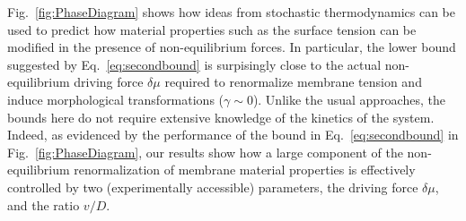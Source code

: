 \documentclass[amsmath,preprintnumbers,10pt,nofootinbib,prl,twocolumn]{revtex4-1}
\begin{document}
Fig.~\ref{fig:PhaseDiagram} shows how ideas from stochastic thermodynamics can be used to predict how material properties such as the surface tension can be modified in the presence of non-equilibrium forces. In particular, the lower bound suggested by Eq.~\ref{eq:secondbound} is surpisingly close to the actual non-equilibrium driving force $\delta \mu$ required to renormalize membrane tension and induce morphological transformations ($\gamma\sim 0$). Unlike the usual approaches, the bounds here do not require extensive knowledge of the kinetics of the system. Indeed, as evidenced by the performance of the bound in Eq.~\ref{eq:secondbound} in Fig.~\ref{fig:PhaseDiagram}, our results show how a large component of the non-equilibrium renormalization of membrane material properties is effectively controlled by two (experimentally accessible) parameters, the driving force $\delta \mu$, and the ratio $v/D$. 




\end{document}
